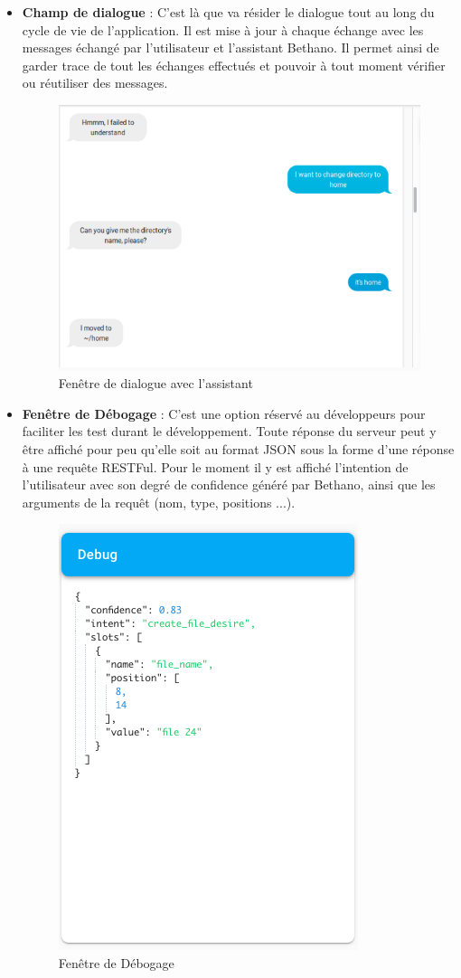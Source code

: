 \begin{itemize}
	\item \textbf{Champ de dialogue} : C'est là que va résider le dialogue tout au long du cycle de vie de l'application. Il est mise à jour à chaque échange avec les messages échangé par l'utilisateur et l'assistant Bethano. Il permet ainsi de garder trace de tout les échanges effectués et pouvoir à tout moment vérifier ou réutiliser des messages.
	\begin{figure}[H]
		\centering
		\includegraphics[width=.6\linewidth]{images/Realisation/chat_box_yass.png}
		\caption{Fenêtre de dialogue avec l'assistant}
	\end{figure} 
	
	\item \textbf{Fenêtre de Débogage} : C'est une option réservé au développeurs pour faciliter les test durant le développement. Toute réponse du serveur peut y être affiché pour peu qu'elle soit au format JSON sous la forme d'une réponse à une requête RESTFul. Pour le moment il y est affiché l'intention de l'utilisateur avec son degré de confidence généré par Bethano, ainsi que les arguments de la requêt (nom, type, positions ...).
	
	\begin{figure}[H]
		\centering
		\includegraphics[width=.4\linewidth]{images/Realisation/intent_box.png}
		\caption{Fenêtre de Débogage}
	\end{figure} 

\end{itemize}
